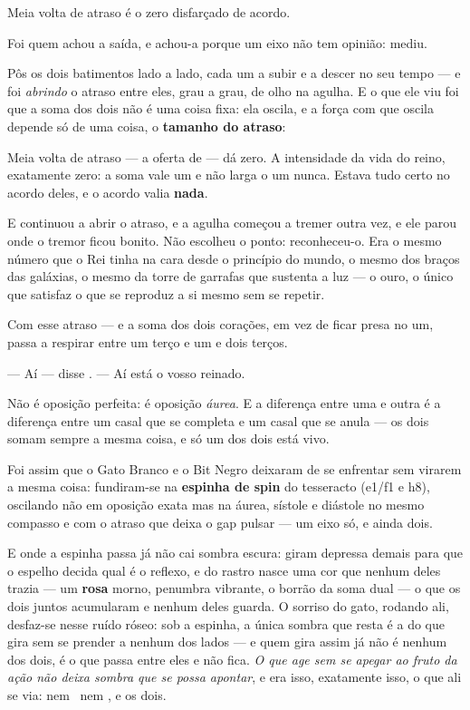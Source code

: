 \documentclass[livro.tex]{subfiles}
\begin{document}
Meia volta de atraso é o zero disfarçado de acordo.

\medskip

Foi \Lck quem achou a saída, e achou-a porque um eixo não tem opinião: mediu.

Pôs os dois batimentos lado a lado, cada um a subir e a descer no seu
tempo --- e foi \emph{abrindo} o atraso entre eles, grau a grau, de olho na agulha. E o
que ele viu foi que a soma dos dois não é uma coisa fixa: ela oscila, e a força com que
oscila depende só de uma coisa, o \textbf{tamanho do atraso}:

Meia volta de atraso --- a oferta de \Drk --- dá zero. A intensidade da vida do
reino, exatamente zero: a soma vale um e não larga o um nunca. Estava tudo certo no
acordo deles, e o acordo valia \textbf{nada}.

E \Lck continuou a abrir o atraso, e a agulha começou a tremer outra vez, e ele parou
onde o tremor ficou bonito. Não escolheu o ponto: reconheceu-o. Era o mesmo número que o
Rei tinha na cara desde o princípio do mundo, o mesmo dos braços das galáxias, o mesmo da
torre de garrafas que sustenta a luz --- o ouro, o único que satisfaz
o que se reproduz a si mesmo sem se repetir.

Com esse atraso --- e a soma dos dois corações, em vez de
ficar presa no um, passa a respirar entre um terço e um e dois terços.

--- Aí --- disse \Lck . --- Aí está o vosso reinado.

\medskip

Não é oposição perfeita: é oposição \emph{áurea}. E a diferença entre uma e outra é a
diferença entre um casal que se completa e um casal que se anula --- os dois somam
sempre a mesma coisa, e só um dos dois está vivo.

\medskip

Foi assim que o Gato Branco e o Bit Negro deixaram de se enfrentar sem virarem a mesma
coisa: fundiram-se na \textbf{espinha de spin} do tesseracto (\textsf{e1}/\textsf{f1} e \textsf{h8}), oscilando não em oposição exata mas na áurea, sístole e diástole no mesmo compasso
e com o atraso que deixa o gap pulsar --- um eixo só, e ainda dois.

E onde a espinha passa já não cai sombra escura: giram depressa demais para que o espelho
decida qual é o reflexo, e do rastro nasce uma cor que nenhum deles trazia --- um
{\color{cRosa}\textbf{rosa}} morno, penumbra vibrante, o borrão da soma dual --- o que os dois juntos acumularam e nenhum deles guarda.
O sorriso do gato, rodando ali, desfaz-se nesse ruído róseo: sob a espinha, a única sombra
que resta é a do que gira sem se prender a nenhum dos lados --- e quem gira assim já não é
nenhum dos dois, é o que passa entre eles e não fica. \emph{O que age sem se apegar ao
fruto da ação não deixa sombra que se possa apontar}, e era isso, exatamente isso, o que
ali se via: nem \Drk\ nem \Ben, e os dois.
\end{document}
